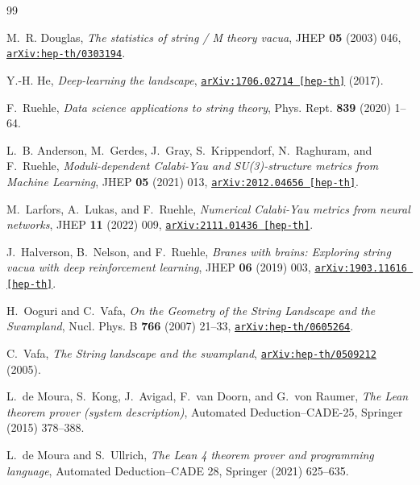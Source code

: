 \documentclass[11pt,a4paper]{article}
\begin{document}
\begin{thebibliography}{99}

M.~R. Douglas,
\emph{The statistics of string / M theory vacua},
JHEP \textbf{05} (2003) 046,
\href{https://arxiv.org/abs/hep-th/0303194}{\texttt{arXiv:hep-th/0303194}}.

Y.-H. He,
\emph{Deep-learning the landscape},
\href{https://arxiv.org/abs/1706.02714}{\texttt{arXiv:1706.02714 [hep-th]}} (2017).

F.~Ruehle,
\emph{Data science applications to string theory},
Phys. Rept. \textbf{839} (2020) 1--64.

L.~B. Anderson, M.~Gerdes, J.~Gray, S.~Krippendorf, N.~Raghuram, and F.~Ruehle,
\emph{Moduli-dependent Calabi-Yau and SU(3)-structure metrics from Machine Learning},
JHEP \textbf{05} (2021) 013,
\href{https://arxiv.org/abs/2012.04656}{\texttt{arXiv:2012.04656 [hep-th]}}.

M.~Larfors, A.~Lukas, and F.~Ruehle,
\emph{Numerical Calabi-Yau metrics from neural networks},
JHEP \textbf{11} (2022) 009,
\href{https://arxiv.org/abs/2111.01436}{\texttt{arXiv:2111.01436 [hep-th]}}.

J.~Halverson, B.~Nelson, and F.~Ruehle,
\emph{Branes with brains: Exploring string vacua with deep reinforcement learning},
JHEP \textbf{06} (2019) 003,
\href{https://arxiv.org/abs/1903.11616}{\texttt{arXiv:1903.11616 [hep-th]}}.

H.~Ooguri and C.~Vafa,
\emph{On the Geometry of the String Landscape and the Swampland},
Nucl. Phys. B \textbf{766} (2007) 21--33,
\href{https://arxiv.org/abs/hep-th/0605264}{\texttt{arXiv:hep-th/0605264}}.

C.~Vafa,
\emph{The String landscape and the swampland},
\href{https://arxiv.org/abs/hep-th/0509212}{\texttt{arXiv:hep-th/0509212}} (2005).

L.~de Moura, S.~Kong, J.~Avigad, F.~van Doorn, and G.~von Raumer,
\emph{The Lean theorem prover (system description)},
Automated Deduction--CADE-25, Springer (2015) 378--388.

L.~de Moura and S.~Ullrich,
\emph{The Lean 4 theorem prover and programming language},
Automated Deduction--CADE 28, Springer (2021) 625--635.


\end{thebibliography}
\end{document}
